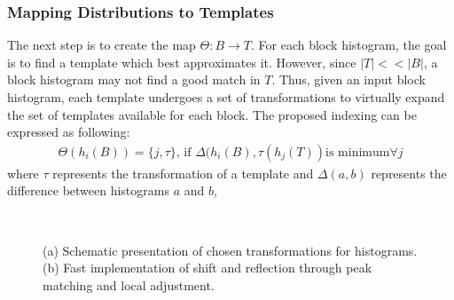 \subsubsection{Mapping Distributions to Templates}
\label{subsec:encoding}
The next step is to create the map $\Theta: B\to T$. For each block histogram, the goal is to find a template which best approximates it. However, since $|T|<<|B|$, a block histogram may not find a good match in $T$. Thus, given an input block histogram, each template undergoes a set of transformations to virtually expand the set of templates available for each block. The proposed indexing can be expressed as following:
\begin{align*}
\Theta(h_i(B)) = \{ j, \tau \}
\text{, if } \Delta(h_i(B),\tau(h_j(T)) \text{is minimum} \forall j
\end{align*}
where $\tau$ represents the transformation of a template and $\Delta(a,b)$ represents the difference between histograms $a$ and $b$, 
\begin{figure}[tb]
\centering
	~
	\caption{(a) Schematic presentation of chosen transformations for histograms. (b) Fast implementation of shift and reflection through  peak matching and local adjustment.}	
	\label{fig:histtransform}
\end{figure}

